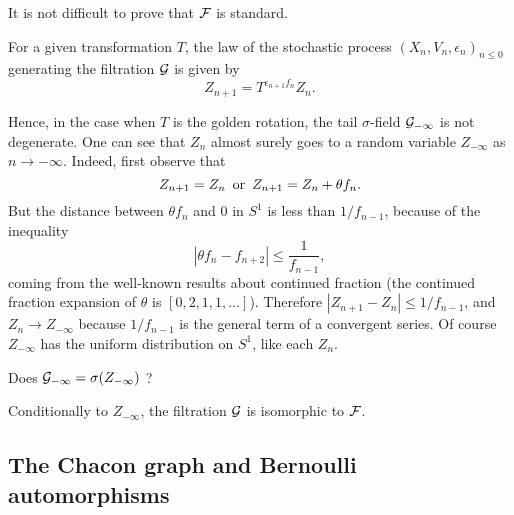 \documentclass[12pt,a4paper]{article}
\begin{document}
It is not difficult to prove that $\mathcal{F}$ is standard. 

For a given transformation $T$, the law of the stochastic process 
${(X_n, V_n, \epsilon_n)}_{n \leq 0}$ generating the filtration $\mathcal{G}$ 
is given by 
$$
Z_{n+1} = T^{\epsilon_{n+1}f_n}Z_n.
$$

Hence, in the case when $T$ is the golden rotation, the tail $\sigma$-field 
$\mathcal{G}_{-\infty}$ is not degenerate. 
One can see that $Z_n$ almost surely goes to a random variable $Z_{-\infty}$ 
as $n \to -\infty$.  
Indeed, first observe that
$$
Z_{n+1} = Z_n \, \text{ or\, $Z_{n+1} = Z_n + \theta f_n$}. 
$$
But the distance between $\theta f_n$ and $0$ in $S^1$ is less than 
$1/f_{n-1}$, because of the inequality
$$
|\theta f_n - f_{n+2}| \leq \frac{1}{f_{n-1}},
$$
coming from the well-known results about continued fraction 
(the continued fraction expansion of $\theta$ is $[0, 2, 1, 1, \ldots]$). 
Therefore $|Z_{n+1} - Z_n| \leq 1/f_{n-1}$, and $Z_n \to Z_{-\infty}$ because 
$1/f_{n-1}$ is the general term of a convergent series. 
Of course $Z_{-\infty}$ has the uniform distribution on $S^1$, like each $Z_n$.

\begin{question}
Does $\mathcal{G}_{-\infty} = \sigma(Z_{-\infty})$ ? 
\end{question}

\begin{clarify}
Conditionally to $Z_{-\infty}$, the filtration $\mathcal{G}$ is isomorphic to $\mathcal{F}$.  
\end{clarify}



\subsection{The Chacon graph and Bernoulli automorphisms}
\end{document}
